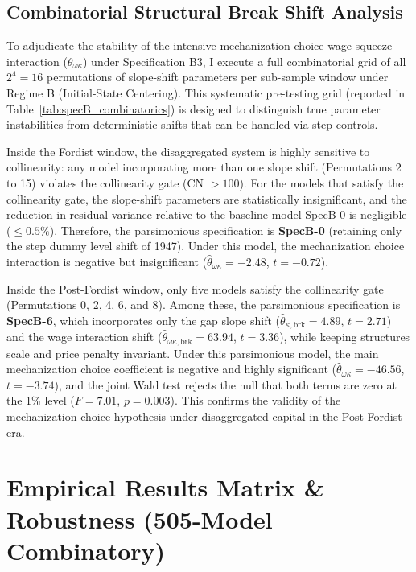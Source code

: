 \documentclass[11pt,a4paper]{article}
\begin{document}
\subsection{Combinatorial Structural Break Shift Analysis}

To adjudicate the stability of the intensive mechanization choice wage squeeze interaction ($\theta_{\omega\kappa}$) under Specification B3, I execute a full combinatorial grid of all $2^4 = 16$ permutations of slope-shift parameters per sub-sample window under Regime B (Initial-State Centering). This systematic pre-testing grid (reported in Table~\ref{tab:specB_combinatorics}) is designed to distinguish true parameter instabilities from deterministic shifts that can be handled via step controls.

Inside the Fordist window, the disaggregated system is highly sensitive to collinearity: any model incorporating more than one slope shift (Permutations 2 to 15) violates the collinearity gate (CN $> 100$). For the models that satisfy the collinearity gate, the slope-shift parameters are statistically insignificant, and the reduction in residual variance relative to the baseline model SpecB-0 is negligible ($\le 0.5\%$). Therefore, the parsimonious specification is \textbf{SpecB-0} (retaining only the step dummy level shift of 1947). Under this model, the mechanization choice interaction is negative but insignificant ($\hat{\theta}_{\omega\kappa} = -2.48$, $t = -0.72$).

Inside the Post-Fordist window, only five models satisfy the collinearity gate (Permutations 0, 2, 4, 6, and 8). Among these, the parsimonious specification is \textbf{SpecB-6}, which incorporates only the gap slope shift ($\hat{\theta}_{\kappa,\text{brk}} = 4.89$, $t = 2.71$) and the wage interaction shift ($\hat{\theta}_{\omega\kappa,\text{brk}} = 63.94$, $t = 3.36$), while keeping structures scale and price penalty invariant. Under this parsimonious model, the main mechanization choice coefficient is negative and highly significant ($\hat{\theta}_{\omega\kappa} = -46.56$, $t = -3.74$), and the joint Wald test rejects the null that both terms are zero at the 1\% level ($F = 7.01$, $p = 0.003$). This confirms the validity of the mechanization choice hypothesis under disaggregated capital in the Post-Fordist era.



\FloatBarrier
\section{Empirical Results Matrix \& Robustness (505-Model Combinatory)}
\end{document}

